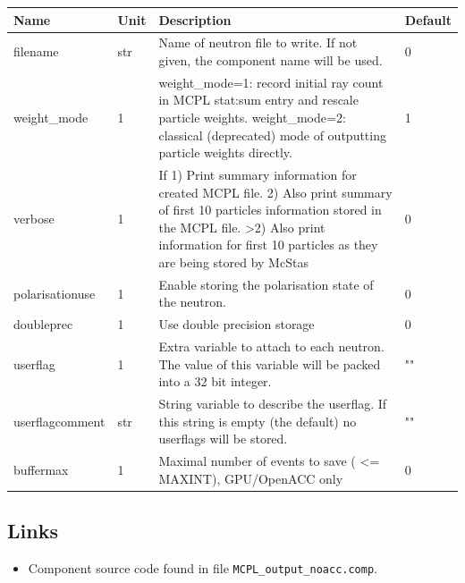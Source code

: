 \begin{longtable}{p{}p{}p{}p{}}
\toprule
\textbf{Name} & \textbf{Unit} & \textbf{Description} & \textbf{Default} \\
\midrule
\endhead
filename & str & Name of neutron file to write. If not given, the component name will be used. & 0 \\
weight\_mode & 1 & weight\_mode=1: record initial ray count in MCPL stat:sum entry and rescale particle weights. weight\_mode=2: classical (deprecated) mode of outputting particle weights directly. & 1 \\
verbose & 1 & If 1) Print summary information for created MCPL file. 2) Also print summary of first 10 particles information stored in the MCPL file. \textgreater{}2) Also print information for first 10 particles as they are being stored by McStas & 0 \\
polarisationuse & 1 & Enable storing the polarisation state of the neutron. & 0 \\
doubleprec & 1 & Use double precision storage & 0 \\
userflag & 1 & Extra variable to attach to each neutron. The value of this variable will be packed into a 32 bit integer. & "" \\
userflagcomment & str & String variable to describe the userflag. If this string is empty (the default) no userflags will be stored. & "" \\
buffermax & 1 & Maximal number of events to save ( \textless{}= MAXINT), GPU/OpenACC only & 0 \\
\bottomrule
\end{longtable}

\subsection*{Links}
\begin{itemize}
  \item Component source code found in file \texttt{MCPL\_output\_noacc.comp}.
\end{itemize}
